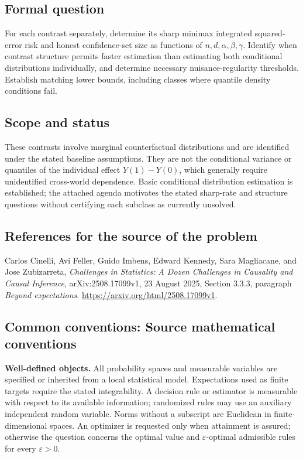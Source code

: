 \documentclass[11pt,a4paper]{article}
\begin{document}
\subsection*{Formal question}
For each contrast separately, determine its sharp minimax integrated squared-error risk and honest confidence-set size as functions of $n,d,\alpha,\beta,\gamma$. Identify when contrast structure permits faster estimation than estimating both conditional distributions individually, and determine necessary nuisance-regularity thresholds. Establish matching lower bounds, including classes where quantile density conditions fail.
\subsection*{Scope and status}
These contrasts involve marginal counterfactual distributions and are identified under the stated baseline assumptions. They are not the conditional variance or quantiles of the individual effect $Y(1)-Y(0)$, which generally require unidentified cross-world dependence. Basic conditional distribution estimation is established; the attached agenda motivates the stated sharp-rate and structure questions without certifying each subclass as currently unsolved.
\subsection*{References for the source of the problem}
Carlos Cinelli, Avi Feller, Guido Imbens, Edward Kennedy, Sara Magliacane, and Jose Zubizarreta, \emph{Challenges in Statistics: A Dozen Challenges in Causality and Causal Inference}, arXiv:2508.17099v1, 23 August 2025, Section 3.3.3, paragraph \emph{Beyond expectations}. \url{https://arxiv.org/html/2508.17099v1}.

\subsection*{Common conventions: Source mathematical conventions}

\textbf{Well-defined objects.}
All probability spaces and measurable variables are specified or inherited
from a local statistical model. Expectations used as finite targets require
the stated integrability. A decision rule or estimator is measurable with
respect to its available information; randomized rules may use an auxiliary
independent random variable. Norms without a subscript are Euclidean in
finite-dimensional spaces. An optimizer is requested only when attainment
is assured; otherwise the question concerns the optimal value and
$\varepsilon$-optimal admissible rules for every $\varepsilon>0$.
\end{document}
